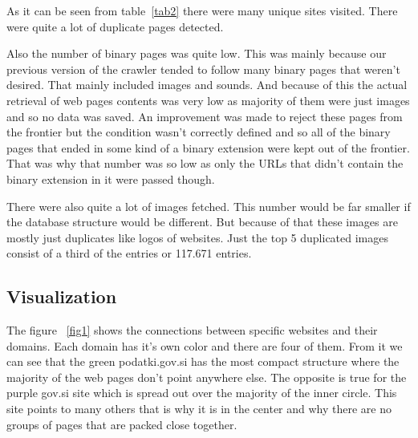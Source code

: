 \documentclass[9pt]{IEEEtran}
\begin{document}
As it can be seen from table~\ref{tab2} there were many unique sites visited. 
There were quite a lot of duplicate pages detected.

Also the number of binary pages was quite low.
This was mainly because our previous version of the crawler tended to follow many binary pages that weren't desired.
That mainly included images and sounds.
And because of this the actual retrieval of web pages contents was very low as majority of them were just images and so no data was saved.
An improvement was made to reject these pages from the frontier but the condition wasn't correctly defined and so all of the binary pages that ended in some kind of a binary extension were kept out of the frontier.
That was why that number was so low as only the URLs that didn't contain the binary extension in it were passed though. 

There were also quite a lot of images fetched.
This number would be far smaller if the database structure would be different.
But because of that these images are mostly just duplicates like logos of websites.
Just the top 5 duplicated images consist of a third of the entries or 117.671 entries.

\subsection{Visualization}

The figure ~\ref{fig1} shows the connections between specific websites and their domains.
Each domain has it's own color and there are four of them.
From it we can see that the green podatki.gov.si has the most compact structure where the majority of the web pages don't point anywhere else.
The opposite is true for the purple gov.si site which is spread out over the majority of the inner circle.
This site points to many others that is why it is in the center and why there are no groups of pages that are packed close together.
\end{document}

